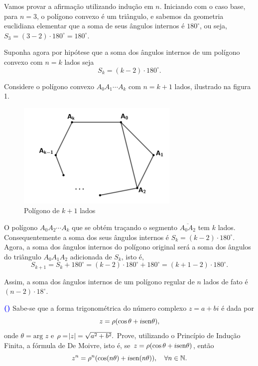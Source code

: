 \documentclass[12pt, a4paper]{article}
\newcommand{\sen}{{\rm sen}}
\newcounter{exercicio}[section]
\newenvironment{exercicio}[1][]{\refstepcounter{exercicio}\par\medskip
 \textcolor{blue}{\bf(\theexercicio)} \rmfamily}{\medskip }
\begin{document}
\begin{solution}
Vamos provar a afirmação utilizando indução em $n.$ Iniciando com o caso base, para $n=3$, o polígono convexo é um triângulo, e sabemos da geometria euclidiana elementar que a soma de seus ângulos internos é  $180^{\circ}$, ou seja, $S_{3}= \left( 3-2 \right) \cdot180 ^{\circ} =180 ^{\circ}$.

Suponha agora por hipótese que a soma dos ângulos internos de um polígono convexo com  $n=k$ lados seja \[S_{k}= \left( k-2 \right) \cdot180^{\circ}.\]

Considere o polígono convexo  $A_{0}A_{1} \cdots A_{k}$  com  $n=k+1$ lados, ilustrado na figura 1. 

\begin{figure}[!htb]
    \centering
    \includegraphics[scale=0.90]{Listas/lista1-ex11.png}
    \caption{Polígono de $k+1$ lados}
    \label{figur}
\end{figure}

O polígono $A_{0}A_{2} \cdots A_{k}$  que se obtém traçando o segmento $\overline{A_{0}A_{2}}$ tem $k$ lados. Consequentemente a soma dos seus ângulos internos é $S_{k}= \left( k-2 \right) \cdot180 ^{\circ}$. Agora, a soma dos ângulos internos do polígono original será a soma dos ângulos do triângulo $A_{0}A_{1}A_{2}$ adicionada de  $S_{k}$, isto é, \[S_{k+1}=S_{k}+180^{\circ} = \left( k-2 \right) \cdot180 ^{\circ} +180 ^{\circ} = \left( k+1-2 \right)\cdot180^{\circ}.\]

Assim, a soma dos ângulos internos de um polígono regular de $n$ lados de fato é $(n-2) \cdot 18^{\circ}.$

\end{solution}
\begin{exercicio}
Sabe-se que a forma trigonométrica do número complexo $z = a + bi$ é dada por
\[
z = \rho (\cos \theta + i \sen \theta),
\]
onde $\theta = \text{arg } z$ e $\rho = \abs{z} = \sqrt{a^2 + b^2}.$ Prove, utilizando o Princípio de Indução Finita, a fórmula de De Moivre, isto é, se $z = \rho (\cos \theta + i \sen \theta)$, então
\[
z^n = \rho^n (\cos (n\theta) + i \sen (n\theta)), \quad \forall n \in \mathbb{N}.
\]
\end{exercicio}
\end{document}
